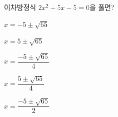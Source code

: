 이차방정식 $2x^2+5x-5=0$을 풀면?
\begin{choicesii}{\rule[-3ex]{0pt}{8ex}$x=-5\pm\sqrt{65}$}{\rule[-3ex]{0pt}{8ex}$x=5\pm\sqrt{65}$}{\rule[-3ex]{0pt}{8ex}$x=\dfrac{-5\pm\sqrt{65}}{4}$}{\rule[-3ex]{0pt}{8ex}$x=\dfrac{5\pm\sqrt{65}}{4}$}{\rule[-3ex]{0pt}{8ex}$x=\dfrac{-5\pm\sqrt{65}}{2}$}\end{choicesii}
